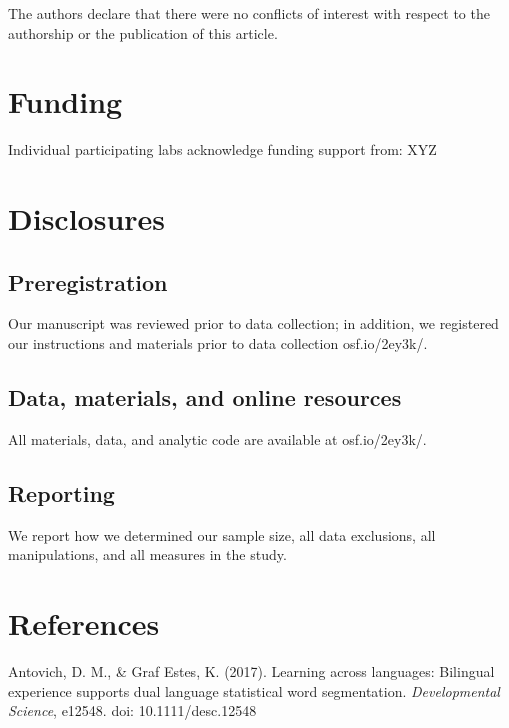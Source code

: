 \documentclass[,man,floatsintext]{apa6}
\begin{document}
The authors declare that there were no conflicts of interest with respect to the authorship or the publication of this article.

\hypertarget{funding}{%
\section{Funding}\label{funding}}

Individual participating labs acknowledge funding support from: XYZ

\hypertarget{disclosures}{%
\section{Disclosures}\label{disclosures}}

\hypertarget{preregistration}{%
\subsection{Preregistration}\label{preregistration}}

Our manuscript was reviewed prior to data collection; in addition, we registered our instructions and materials prior to data collection osf.io/2ey3k/.

\hypertarget{data-materials-and-online-resources}{%
\subsection{Data, materials, and online resources}\label{data-materials-and-online-resources}}

All materials, data, and analytic code are available at osf.io/2ey3k/.

\hypertarget{reporting}{%
\subsection{Reporting}\label{reporting}}

We report how we determined our sample size, all data exclusions, all manipulations, and all measures in the study.

\newpage

\hypertarget{references}{%
\section{References}\label{references}}

Antovich, D. M., \& Graf Estes, K. (2017). Learning across languages: Bilingual experience supports dual language statistical word segmentation. \emph{Developmental Science}, e12548. doi: 10.1111/desc.12548
\end{document}
